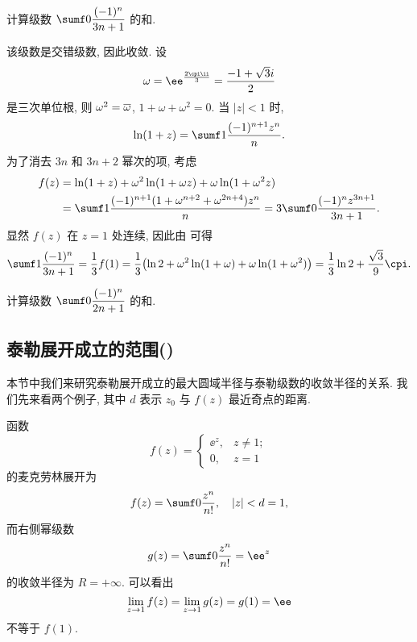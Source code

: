 \begin{example}
  计算级数 $\sumf0 \dfrac{(-1)^n}{3n+1}$ 的和.
\end{example}

\begin{solution}
  该级数是交错级数, 因此收敛.
  设
  \[
    \omega=\ee^{\frac{2\cpi\ii}3}=\frac{-1+\sqrt 3i}2
  \]
  是三次单位根, 则 $\omega^2=\overline\omega$, $1+\omega+\omega^2=0$.
  当 $|z|<1$ 时,
  \[
    \ln(1+z)=\sumf1 \frac{(-1)^{n+1}z^n}{n}.
  \]
  为了消去 $3n$ 和 $3n+2$ 幂次的项, 考虑
  \begin{align*}
    f(z)&=\ln(1+z)+\omega^2\ln(1+\omega z)+\omega\ln(1+\omega^2 z)\\
    &=\sumf1 \frac{(-1)^{n+1}(1+\omega^{n+2}+\omega^{2n+4})z^n}{n}
    =3\sumf0 \frac{(-1)^n z^{3n+1}}{3n+1}.
  \end{align*}
  显然 $f(z)$ 在 $z=1$ 处连续, 因此由 可得
  \[
     \sumf1 \dfrac{(-1)^n}{3n+1}
    =\frac13 f(1)
    =\frac13\bigl(\ln2+\omega^2\ln(1+\omega)+\omega\ln(1+\omega^2)\bigr)
    =\frac13\ln2+\frac{\sqrt3}9\cpi.
  \]
\end{solution}

\begin{exercise}
  计算级数 $\sumf0 \dfrac{(-1)^n}{2n+1}$ 的和.
\end{exercise}


\subsection{泰勒展开成立的范围(\optional)}
\label{ssec:taylor-expansion-radius}

本节中我们来研究泰勒展开成立的最大圆域半径与泰勒级数的收敛半径的关系.
我们先来看两个例子, 其中 $d$ 表示 $z_0$ 与 $f(z)$ 最近奇点的距离.

\begin{example}
  函数
  \[
    f(z)=\begin{cases}
      \ee^z,&z\neq 1;\\
      0,&z=1
    \end{cases}
  \]
  的麦克劳林展开为
  \[
    f(z)=\sumf0 \dfrac{z^n}{n!},\quad |z|<d=1,
  \]
  而右侧幂级数
  \[
    g(z)=\sumf0 \dfrac{z^n}{n!}=\ee^z
  \]
  的收敛半径为 $R=+\infty$.
  可以看出
  \[
    \lim_{z\ra 1} f(z)=\lim_{z\ra 1}g(z)=g(1)=\ee
  \]
  不等于 $f(1)$.
\end{example}

